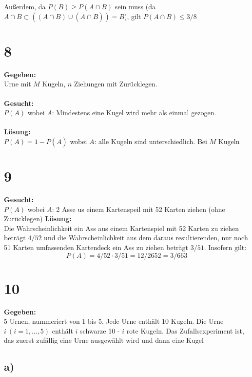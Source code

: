 \documentclass{article}
\begin{document}
Außerdem, da $P(B) \geq P(A \cap B )$ sein muss (da $A \cap B \subset ((A \cap B) \cup (\overline{A} \cap B)) = B $), gilt $P(A\cap B) \leq 3/8$

\section*{8}

\textbf{Gegeben:}\\

Urne mit $M$ Kugeln, $n$ Ziehungen mit Zurücklegen. \\ \\
\textbf{Gesucht:} \\

$P(A)$ wobei $A$: Mindestens eine Kugel wird mehr als einmal gezogen. \\ \\
\textbf{Lösung:} \\ 

$P(A) = 1 - P(\overline{A})$ wobei $\overline{A}$: alle Kugeln sind unterschiedlich. Bei $M$ Kugeln 

\section*{9}


\textbf{Gesucht:} \\


$P(A)$ wobei $A$:  2 Asse us einem Kartenspeil mit 52 Karten ziehen (ohne Zurücklegen)
\textbf{Lösung:} \\

Die Wahrscheinlichkeit ein Ass aus einem Kartenspiel mit 52 Karten zu ziehen beträgt $4/52$ und die Wahrscheinlichkeit aus dem daraus resultierenden, nur noch 51 Karten umfassenden Kartendeck ein Ass zu ziehen beträgt $3/51$. Insofern gilt: \[ P(A) = 4/52 \cdot 3/51 = 12/2652= 3/663\]
 

\section*{10}


\textbf{Gegeben:} \\

$5$ Urnen, nummeriert von $1$ bis $5$. Jede Urne enthält $10$ Kugeln. Die Urne $i ~ (i = 1,...,5)$ enthält $i$ schwarze 10 - $i$ rote Kugeln. Das Zufallsexperiment ist, das zuerst zufällig eine Urne ausgewählt wird und dann eine Kugel
\subsection{a)}
\end{document}
